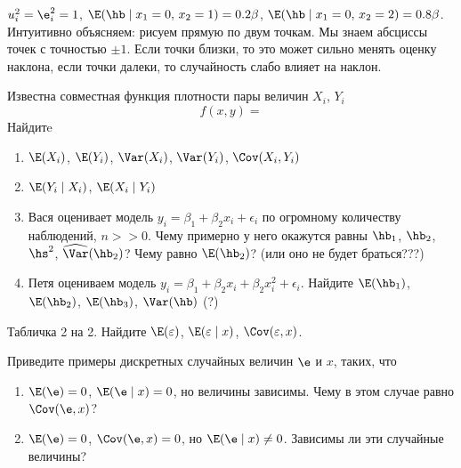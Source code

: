 \documentclass[pdftex,11pt,openany]{book}\usepackage[]{graphicx}\usepackage[]{color}
\begin{document}
\begin{solution}
$u_i^2=\e_i^2=1$, $\E(\hb \mid x_1=0, \, x_2=1)=0.2\beta$, $\E(\hb \mid x_1=0, \, x_2=2)=0.8\beta$. Интуитивно объясняем: рисуем прямую по двум точкам. Мы знаем абсциссы точек с точностью $\pm 1$. Если точки близки, то это может сильно менять оценку наклона, если точки далеки, то случайность слабо влияет на наклон.
\end{solution}

\begin{problem}
Известна совместная функция плотности пары величин $X_i$, $Y_i$
\[
f(x,y)=
\]
Найдитe 
\begin{enumerate}
\item $\E(X_i)$, $\E(Y_i)$, $\Var(X_i)$, $\Var(Y_i)$, $\Cov(X_i,Y_i)$
\item $\E(Y_i \mid X_i)$, $\E(X_i \mid Y_i)$
\item Вася оценивает модель $y_i=\beta_1+\beta_2 x_i+\epsilon_i$ по огромному количеству наблюдений, $n>>0$. Чему примерно у него окажутся равны $\hb_1$, $\hb_2$, $\hs^2$, $\widehat{\Var}(\hb_2)$? Чему равно $\E(\hb_2)$? (или оно не будет браться???)
\item Петя оцениваем модель $y_i=\beta_1+\beta_2 x_i+\beta_2 x_i^2+\epsilon_i$. Найдите $\E(\hb_1)$, $\E(\hb_2)$, $\E(\hb_3)$, $\Var(\hb)$ (?)
\end{enumerate}
\end{problem}

\begin{solution}
\end{solution}

\begin{problem}
Табличка 2 на 2. Найдите $\E(\varepsilon)$, $\E(\varepsilon \mid x)$, $\Cov(\varepsilon,x)$.
\end{problem}

\begin{solution}
\end{solution}

\begin{problem}
Приведите примеры дискретных случайных величин $\e$ и $x$, таких, что
\begin{enumerate}
\item $\E(\e)=0$, $\E(\e\mid x)=0$, но величины зависимы. Чему в этом случае равно $\Cov(\e,x)$?
\item $\E(\e)=0$, $\Cov(\e,x)=0$, но $\E(\e\mid x)\neq 0$. Зависимы ли эти случайные величины? 
\end{enumerate}
\end{problem}
\end{document}
